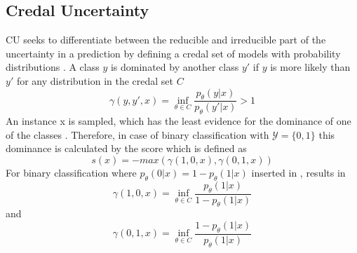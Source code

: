 \subsection{Credal Uncertainty}  
\label{subsec:credal_uncertainty}

\ac{CU} seeks to differentiate between the reducible and irreducible part of the uncertainty in a prediction by defining a credal set of models with probability distributions \cite{nguyen2021howtomeasure}.
A class $y$ is dominated by another class $y'$ if $y$ is more likely than $y'$ for any distribution in the credal set $C$ \cite{nguyen2021howtomeasure}
\begin{equation} \label{eq:credal_uncertainty_dominance}
\gamma(y,y',x) = \inf_{\theta \in C} \frac{p_{\theta}(y | x)}{p_{\theta}(y' | x)} > 1
\end{equation} 
An instance x is sampled, which has the least evidence for the dominance of one of the classes \cite{nguyen2021howtomeasure}.
Therefore, in case of binary classification with $\mathcal{Y} = \{0, 1\}$ this dominance is calculated by the score which is defined as
\begin{equation}
    s(x) = -max (\gamma(1,0,x), \gamma(0,1,x))
\end{equation} 
For binary classification where $p_{\theta}(0|x) = 1 - p_{\theta}(1|x)$ inserted in , results in  
\begin{equation}
\gamma(1,0,x) = \inf_{\theta \in C} \frac{p_{\theta}(1 | x)}{1 - p_{\theta}(1 | x)}
\end{equation} 
and
\begin{equation}
\gamma(0,1,x) = \inf_{\theta \in C} \frac{1 - p_{\theta}(1 | x)}{p_{\theta}(1 | x)}
\end{equation} 